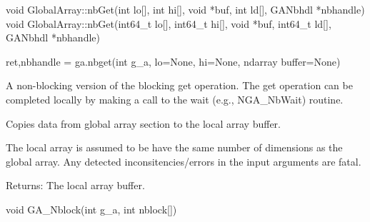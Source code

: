 \documentclass[12pt]{article}
\begin{document}
\begin{cxxapi}
\begin{cxxcode}
void GlobalArray::nbGet(int lo[], int hi[],
                        void *buf, int ld[], GANbhdl *nbhandle)
void GlobalArray::nbGet(int64_t lo[], int64_t hi[],
                        void *buf, int64_t ld[], GANbhdl *nbhandle)
\end{cxxcode}
\begin{funcargs}
\end{funcargs}
\end{cxxapi}

\begin{pyapi}
\begin{pycode}
ret,nbhandle = ga.nbget(int g_a, lo=None, hi=None, ndarray buffer=None)
\end{pycode}
\begin{funcargs}
\end{funcargs}
\end{pyapi}

\ncoll

\begin{desc}
A non-blocking version of the blocking get operation. The get operation can be
completed locally by making a call to the wait (e.g., NGA_NbWait) routine.

Copies data from global array section to the local array buffer.

The local array is assumed to be have the same number of dimensions as the
global array. Any detected inconsitencies/errors in the input arguments are
fatal.

Returns: The local array buffer.
\end{desc}



\begin{capi}
\begin{ccode}
void GA_Nblock(int g_a, int nblock[])
\end{ccode}
\begin{funcargs}
\end{funcargs}
\end{capi}
\end{document}
